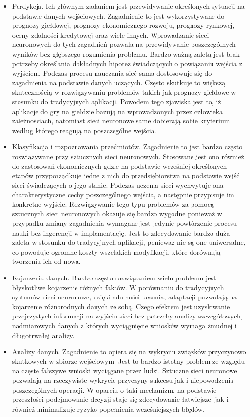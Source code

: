 \begin{itemize}
	\item Perdykcja. Ich głównym zadaniem jest przewidywanie określonych sytuacji na podstawie danych wejściowych. Zagadnienie to jest wykorzystywane do prognozy giełdowej, prognozy ekonomicznego rozwoju, prognozy rynkowej, oceny zdolności kredytowej oraz wiele innych. Wprowadzanie sieci neuronowych do tych zagadnień pozwala na przewidywanie poszczególnych wyników bez głębszego rozumienia problemu. Bardzo ważną zaletą jest brak potrzeby określania dokładnych hipotez świadczących o powiązaniu wejścia z wyjściem. Podczas procesu nauczania sieć sama dostosowuje się do zagadnienia na podstawie danych uczących. Często skutkuje to większą skutecznością w rozwiązywaniu problemów takich jak prognozy giełdowe w stosunku do tradycyjnych aplikacji. Powodem tego zjawiska jest to, iż aplikacje do gry na giełdzie bazują na wprowadzonych przez
	człowieka zależnościach, natomiast sieci neuronowe same dobierają sobie kryterium według którego reagują na poszczególne wejścia.
	\item Klasyfikacja i rozpoznawania przedmiotów. Zagadnienie to jest bardzo często rozwiązywane przy sztucznych sieci neuronowych. Stosowane jest ono również do zastosowań ekonomicznych gdzie na podstawie wcześniej określonych etapów przyporządkuje jedne z nich do przedsiębiorstwa na podstawie wejść sieci świadczących o jego stanie. Podczas uczenia sieci wychwytuje ona charakterystyczne cechy poszczególnego wejścia, a następnie przypisuje im konkretne wyjście. Rozwiązywanie tego typu problemów za pomocą sztucznych sieci neuronowych okazuje się bardzo wygodne ponieważ w przypadku zmiany zagadnienia wymagane jest jedynie powtórzenie procesu nauki bez ingerencji w implementację. Jest to zdecydowanie bardzo duża zaleta w stosunku do tradycyjnych aplikacji, ponieważ nie są one uniwersalne, co powoduje ogromne koszty wszelakich modyfikacji, które dorównują tworzeniu ich od nowa.
	\item Kojarzenia danych. Bardzo często rozwiązaniem wielu problemu jest błyskotliwe kojarzenie różnych faktów. W porównaniu do tradycyjnych systemów sieci neuronowe, dzięki zdolności uczenia, adaptacji pozwalają na kojarzenie różnorodnych danych ze sobą. Czego efektem jest uzyskiwanie przejrzystych informacji na wyjściu sieci bez potrzeby analizy szczegółowych, nadmiarowych danych z których wyciągnięcie wniosków wymaga żmudnej i długotrwałej analizy. 
	\item Analizy danych. Zagadnienie to opiera się na wykryciu związków przyczynowo skutkowych w zbiorze wejściowym. Jest to bardzo istotny problem ze względu na częste fałszywe wnioski wyciągane przez ludzi. Sztuczne sieci neuronowe pozwalają na rzeczywiste wykrycie przyczyny sukcesu jak i niepowodzenia poszczególnych operacji. W oparciu o taki mechanizm, na podstawie przeszłości podejmowanie decyzji staje się zdecydowanie łatwiejsze, jak i również minimalizuje ryzyko popełnienia wcześniejszych błędów.

\end{itemize}
